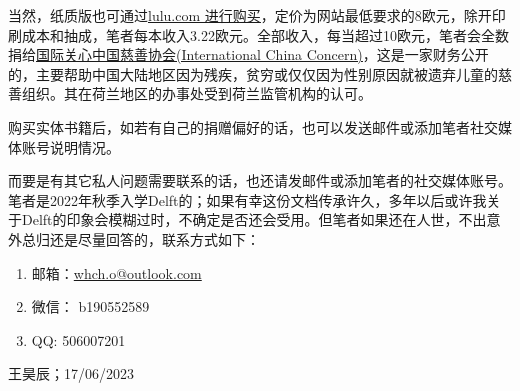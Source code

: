 当然，纸质版也可通过\href{https://www.lulu.com/shop/haochen-wang/me%E6%8C%87%E5%8D%97/paperback/product-8vmyjk.html}{\uline{lulu.com 进行购买}}，定价为网站最低要求的8欧元，除开印刷成本和抽成，笔者每本收入3.22欧元。全部收入，每当超过10欧元，笔者会全数捐给\href{https://chinaconcern.org/zh_hans/?fbclid=IwAR263C_R6_XiYRZrUrad-3TvXTMNcJAJWlTMwOiNIhiyCmAGR3GjPwBWH0w}{\uline{国际关心中国慈善协会(International China Concern)}}，这是一家财务公开的，主要帮助中国大陆地区因为残疾，贫穷或仅仅因为性别原因就被遗弃儿童的慈善组织。其在荷兰地区的办事处受到荷兰监管机构的认可。

购买实体书籍后，如若有自己的捐赠偏好的话，也可以发送邮件或添加笔者社交媒体账号说明情况。

而要是有其它私人问题需要联系的话，也还请发邮件或添加笔者的社交媒体账号。笔者是2022年秋季入学Delft的；如果有幸这份文档传承许久，多年以后或许我关于Delft的印象会模糊过时，不确定是否还会受用。但笔者如果还在人世，不出意外总归还是尽量回答的，联系方式如下：
\begin{enumerate}
\item 邮箱：\href{mailto:whch.o@outlook.com}{whch.o@outlook.com}
\item 微信： b190552589
\item QQ: 506007201
\end{enumerate}

\begin{flushright}
王昊辰；17/06/2023
\end{flushright}
